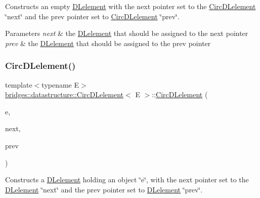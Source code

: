 Constructs an empty \hyperlink{classbridges_1_1datastructure_1_1_d_lelement}{D\+Lelement} with the next pointer set to the \hyperlink{classbridges_1_1datastructure_1_1_circ_d_lelement}{Circ\+D\+Lelement} \char`\"{}next\char`\"{} and the prev pointer set to \hyperlink{classbridges_1_1datastructure_1_1_circ_d_lelement}{Circ\+D\+Lelement} \char`\"{}prev\char`\"{}.


\begin{DoxyParams}{Parameters}
{\em next} & the \hyperlink{classbridges_1_1datastructure_1_1_d_lelement}{D\+Lelement} that should be assigned to the next pointer \\
\hline
{\em prev} & the \hyperlink{classbridges_1_1datastructure_1_1_d_lelement}{D\+Lelement} that should be assigned to the prev pointer \\
\hline
\end{DoxyParams}
\mbox{\label{classbridges_1_1datastructure_1_1_circ_d_lelement_a52b304df48ac1ba5a13b4c3c596f433b}} 
\subsubsection{\texorpdfstring{Circ\+D\+Lelement()}{CircDLelement()}\hspace{0.1cm}{\footnotesize\ttfamily [4/4]}}
{\footnotesize\ttfamily template$<$typename E$>$ \\
\hyperlink{classbridges_1_1datastructure_1_1_circ_d_lelement}{bridges\+::datastructure\+::\+Circ\+D\+Lelement}$<$ E $>$\+::\hyperlink{classbridges_1_1datastructure_1_1_circ_d_lelement}{Circ\+D\+Lelement} (\begin{DoxyParamCaption}\item[{E}]{e,  }\item[{\hyperlink{classbridges_1_1datastructure_1_1_circ_d_lelement}{Circ\+D\+Lelement}$<$ E $>$}]{next,  }\item[{\hyperlink{classbridges_1_1datastructure_1_1_circ_d_lelement}{Circ\+D\+Lelement}$<$ E $>$}]{prev }\end{DoxyParamCaption})\hspace{0.3cm}{\ttfamily [inline]}}

Constructs a \hyperlink{classbridges_1_1datastructure_1_1_d_lelement}{D\+Lelement} holding an object \char`\"{}e\char`\"{}, with the next pointer set to the \hyperlink{classbridges_1_1datastructure_1_1_d_lelement}{D\+Lelement} \char`\"{}next\char`\"{} and the prev pointer set to \hyperlink{classbridges_1_1datastructure_1_1_d_lelement}{D\+Lelement} \char`\"{}prev\char`\"{}.


